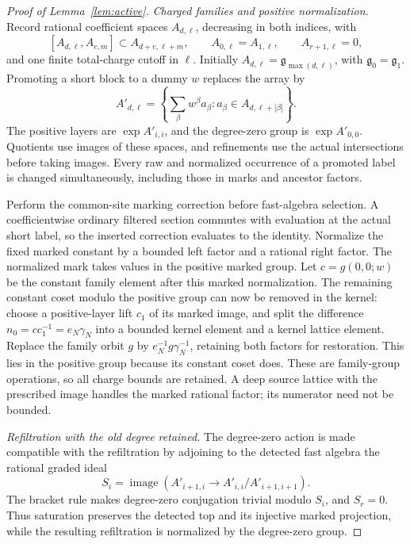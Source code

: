 \documentclass[11pt,a4paper]{article}
\theoremstyle{definition}
\newcommand{\g}{\mathfrak g}
\newcommand{\im}{\operatorname{image}}
\begin{document}
\begin{proof}[Proof of Lemma~\ref{lem:active}]
\textit{Charged families and positive normalization.}
Record rational coefficient spaces \(A_{d,\ell}\), decreasing in both
indices, with
\[
 [A_{d,\ell},A_{e,m}]\subset A_{d+e,\ell+m},\qquad
 A_{0,\ell}=A_{1,\ell},\qquad A_{r+1,\ell}=0,
\]
and one finite total-charge cutoff in \(\ell\).
Initially \(A_{d,\ell}=\g_{\max(d,\ell)}\), with
\(\g_0=\g_1\). Promoting a short block to a dummy \(w\) replaces
the array by
\begin{equation}\label{eq:family}
 A'_{d,\ell}
   =\left\{\sum_\beta w^\beta a_\beta:
                 a_\beta\in A_{d,\ell+|\beta|}\right\}.
\end{equation}
The positive layers are \(\exp A'_{i,i}\), and the
degree-zero group is \(\exp A'_{0,0}\). Quotients use images
of these spaces, and refinements use the actual intersections
before taking images. Every raw and normalized occurrence of a
promoted label is changed simultaneously, including those in
marks and ancestor factors.

Perform the common-site marking correction before fast-algebra
selection. A coefficientwise ordinary filtered section commutes
with evaluation at the actual short label, so the inserted
correction evaluates to the identity. Normalize the fixed marked
constant by a bounded left factor and a rational right factor.
The normalized mark takes values in the positive marked group.
Let \(c=g(0,0;w)\) be the constant family element after this
marked normalization.
The remaining constant coset modulo the positive group can now
be removed in the kernel: choose a positive-layer lift \(c_1\)
of its marked image, and split the difference
\(n_0=cc_1^{-1}=e_N\gamma_N\) into a bounded kernel element
and a kernel lattice element. Replace the family orbit \(g\) by
\(e_N^{-1}g\gamma_N^{-1}\), retaining both factors for restoration.
This lies in the positive group because its constant coset
does. These are family-group operations, so all charge bounds
are retained. A deep source lattice with the prescribed image
handles the marked rational factor; its numerator need not be
bounded.

\textit{Refiltration with the old degree retained.}
The degree-zero action is made compatible with the refiltration
by adjoining to the detected fast algebra the rational graded
ideal
\[
 S_i=\im\!\left(A'_{i+1,i}\longrightarrow
                    A'_{i,i}/A'_{i+1,i+1}\right).
\]
The bracket rule makes degree-zero conjugation trivial modulo
\(S_i\), and \(S_r=0\). Thus saturation preserves the detected
top and its injective marked projection, while the resulting
refiltration is normalized by the degree-zero group.


\end{proof}
\end{document}
